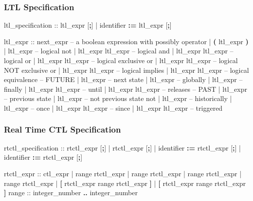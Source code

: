 \subsubsection{LTL Specification}
\begin{Grammar}
ltl_specification ::  ltl_expr [\textbf{;}]
                   |   identifier \textbf{:=} ltl_expr [\textbf{;}]
\end{Grammar}

\begin{Grammar}
ltl_expr ::
    next_expr              -- a boolean expression with possibly  operator
    | \textbf{(} ltl_expr \textbf{)}
    | \operator{!} ltl_expr             -- logical not
    | ltl_expr \operator{\&} ltl_expr    -- logical and
    | ltl_expr \operator{|} ltl_expr    -- logical or
    | ltl_expr  ltl_expr  -- logical exclusive or
    | ltl_expr  ltl_expr -- logical NOT exclusive or
    | ltl_expr \operator{->} ltl_expr   -- logical implies
    | ltl_expr \operator{<->} ltl_expr  -- logical equivalence
    -- FUTURE
    |  ltl_expr             -- next state
    |  ltl_expr             -- globally
    |  ltl_expr             -- finally
    | ltl_expr  ltl_expr    -- until
    | ltl_expr  ltl_expr    -- releases
    -- PAST
    |  ltl_expr             -- previous state
    |  ltl_expr             -- not previous state not
    |  ltl_expr             -- historically
    |  ltl_expr             -- once 
    | ltl_expr  ltl_expr    -- since
    | ltl_expr  ltl_expr    -- triggered
\end{Grammar}


\subsubsection{Real Time CTL Specification}
\begin{Grammar}
rtctl_specification ::  rtctl_expr [\textbf{;}]
                     |  rtctl_expr [\textbf{;}]
                     |   identifier \textbf{:=} rtctl_expr [\textbf{;}]
                     |   identifier \textbf{:=} rtctl_expr [\textbf{;}]
\end{Grammar}

\begin{Grammar}
rtctl_expr ::
        ctl_expr
      |  range rtctl_expr
      |  range rtctl_expr
      |  range rtctl_expr
      |  range rtctl_expr
      |  \textbf{[} rtctl_expr  range rtctl_expr \textbf{]}
      |  \textbf{[} rtctl_expr  range rtctl_expr \textbf{]}
range  :: integer_number \textbf{..} integer_number
\end{Grammar}

